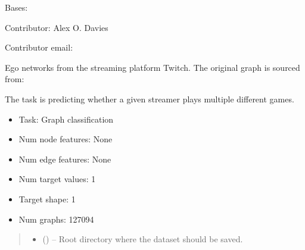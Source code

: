 \documentclass[letterpaper,10pt,english]{sphinxhowto}
\begin{document}
\begin{fulllineitems}
\label{\detokenize{datasets/real:datasets.real.EgoDataset}}
\pysigstartsignatures
{}
\pysigstopsignatures
\sphinxAtStartPar
Bases: 

\sphinxAtStartPar
Contributor: Alex O. Davies

\sphinxAtStartPar
Contributor email: 

\sphinxAtStartPar
Ego networks from the streaming platform Twitch.
The original graph is sourced from:
\begin{quote}

\sphinxAtStartPar
{}
\end{quote}

\sphinxAtStartPar
The task is predicting whether a given streamer plays multiple different games.
\begin{itemize}
\item {} 
\sphinxAtStartPar
Task: Graph classification

\item {} 
\sphinxAtStartPar
Num node features: None

\item {} 
\sphinxAtStartPar
Num edge features: None

\item {} 
\sphinxAtStartPar
Num target values: 1

\item {} 
\sphinxAtStartPar
Target shape: 1

\item {} 
\sphinxAtStartPar
Num graphs: 127094

\end{itemize}
\begin{quote}\begin{description}
\begin{itemize}
\item {} 
\sphinxAtStartPar
{} () – Root directory where the dataset should be saved.


\end{itemize}
\end{description}
\end{quote}
\end{fulllineitems}
\end{document}
